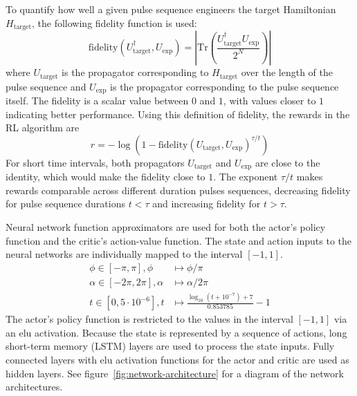 \documentclass{article}
\begin{document}
To quantify how well a given pulse sequence engineers the target Hamiltonian $H_\text{target}$, the following fidelity function is used:
\begin{equation}\label{eq:fidelity}
    \text{fidelity}(U_\text{target}^\dagger, U_\text{exp}) = \left| \text{Tr}\left( \frac{U_\text{target}^\dagger U_\text{exp}}{2^N} \right) \right|
\end{equation}
where $U_\text{target}$ is the propagator corresponding to $H_\text{target}$ over the length of the pulse sequence and $U_\text{exp}$ is the propagator corresponding to the pulse sequence itself. The fidelity is a scalar value between $0$ and $1$, with values closer to $1$ indicating better performance. Using this definition of fidelity, the rewards in the RL algorithm are
\begin{equation}\label{eq:rewards}
    r = -\log\left( 1- \text{fidelity}(U_\text{target}, U_\text{exp})^{\tau/t} \right)
\end{equation}
For short time intervals, both propagators $U_\text{target}$ and $U_\text{exp}$ are close to the identity, which would make the fidelity close to $1$. The exponent $\tau/t$ makes rewards comparable across different duration pulses sequences, decreasing fidelity for pulse sequence durations $t<\tau$ and increasing fidelity for $t>\tau$.

Neural network function approximators are used for both the actor's policy function and the critic's action-value function. The state and action inputs to the neural networks are individually mapped to the interval $[-1,1]$.
\begin{align}
    \phi \in [-\pi, \pi], \phi      &\mapsto \phi / \pi \\
    \alpha \in [-2\pi,2\pi],\alpha  &\mapsto \alpha / 2\pi \\
    t \in [0,5\cdot10^{-6}], t      &\mapsto
        \frac{\log_{10}(t + 10^{-7}) + 7}{0.853785} - 1
\end{align}
The actor's policy function is restricted to the values in the interval $[-1,1]$ via an elu activation.
Because the state is represented by a sequence of actions, long short-term memory (LSTM) layers are used to process the state inputs\cite{lstm}. Fully connected layers with elu activation functions for the actor and critic are used as hidden layers. See figure~\ref{fig:network-architecture} for a diagram of the network architectures.
\end{document}
